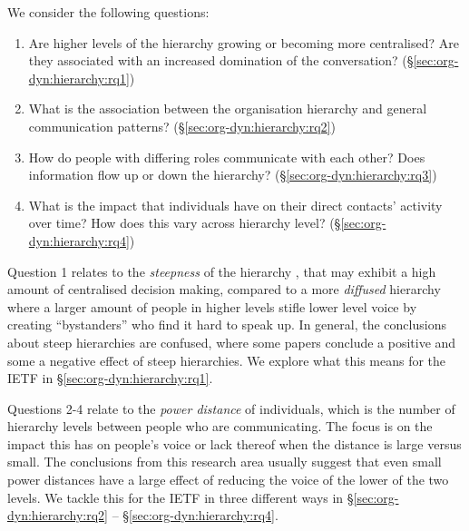 \documentclass[twocolumn,10pt]{article}
\begin{document}

We consider the following questions: 
\begin{enumerate}
  \item
    Are higher levels of the hierarchy growing or becoming more centralised?
    Are they associated with an increased domination of the conversation?
    (\S\ref{sec:org-dyn:hierarchy:rq1})

  \item
    What is the association between the organisation hierarchy and general
    communication patterns?  (\S\ref{sec:org-dyn:hierarchy:rq2})

  \item
    How do people with differing roles communicate with each other?
    Does information flow up or down the hierarchy?
    (\S\ref{sec:org-dyn:hierarchy:rq3})

  \item
    What is the impact that individuals have on their direct contacts'
    activity over time? How does this vary across hierarchy level?
    (\S\ref{sec:org-dyn:hierarchy:rq4})

\end{enumerate}

Question 1 relates to the \emph{steepness} of the hierarchy
\cite{anderson2010functions}, that may exhibit a high amount of centralised
decision making, compared to a more \emph{diffused} \cite{hussain2019voice}
hierarchy where a larger amount of people in higher levels stifle lower
level voice by creating ``bystanders'' who find it hard to speak up. In
general, the conclusions about steep hierarchies are confused, where some
papers conclude a positive and some a negative effect of steep hierarchies.
We explore what this means for the IETF in \S\ref{sec:org-dyn:hierarchy:rq1}.

Questions 2-4 relate to the \emph{power distance}
\cite{li2021does,duan2018authoritarian,guo2020inclusive} of
individuals, which is the number of hierarchy levels between people who are
communicating. The focus is on the impact this has on people's voice or
lack thereof when the distance is large versus small. The conclusions from
this research area usually suggest that even small power distances have a
large effect of reducing the voice of the lower of the two levels. We
tackle this for the IETF in three different ways in
\S\ref{sec:org-dyn:hierarchy:rq2} -- \S\ref{sec:org-dyn:hierarchy:rq4}.
\end{document}
